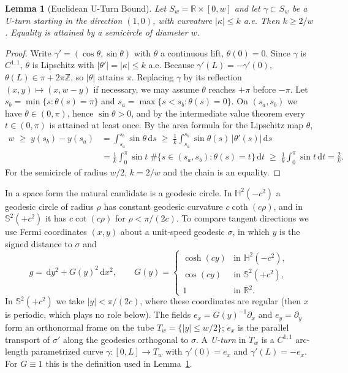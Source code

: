 \documentclass[11pt,reqno]{amsart}
\newtheorem{lemma}[theorem]{Lemma}
\theoremstyle{definition}
\providecommand{\R}{\mathbb{R}}
\providecommand{\Hyp}{\mathbb{H}}
\providecommand{\Sph}{\mathbb{S}}
\providecommand{\dif}{\,\mathrm{d}}
\numberwithin{equation}{section}
\providecommand{\Hyp}{\mathbb{H}}
\providecommand{\Sph}{\mathbb{S}}
\providecommand{\R}{\mathbb{R}}
\begin{document}
\begin{lemma}[Euclidean U-Turn Bound]
\label{lem:euclidean_uturn}
Let $S_w = \R \times [0,w]$ and let $\gamma \subset S_w$ be a U-turn starting in the direction $(1,0)$, with curvature $|\kappa| \le k$ a.e. Then $k \ge 2/w$. Equality is attained by a semicircle of diameter $w$.
\end{lemma}
\begin{proof}
Write $\gamma' = (\cos\theta, \sin\theta)$ with $\theta$ a continuous lift, $\theta(0) = 0$. Since $\gamma$ is $C^{1,1}$, $\theta$ is Lipschitz with $|\theta'| = |\kappa| \le k$ a.e. Because $\gamma'(L) = -\gamma'(0)$, $\theta(L) \in \pi + 2\pi\mathbb{Z}$, so $|\theta|$ attains $\pi$. Replacing $\gamma$ by its reflection $(x,y) \mapsto (x, w - y)$ if necessary, we may assume $\theta$ reaches $+\pi$ before $-\pi$. Let $s_b = \min\{s : \theta(s) = \pi\}$ and $s_a = \max\{s < s_b : \theta(s) = 0\}$. On $(s_a, s_b)$ we have $\theta \in (0, \pi)$, hence $\sin\theta > 0$, and by the intermediate value theorem every $t \in (0,\pi)$ is attained at least once. By the area formula for the Lipschitz map $\theta$,
\[
\begin{aligned}
w \;\ge\; y(s_b) - y(s_a) &= \int_{s_a}^{s_b} \sin\theta \dif s \;\ge\; \frac{1}{k}\int_{s_a}^{s_b} \sin\theta(s)\, |\theta'(s)| \dif s \\
&= \frac{1}{k}\int_0^\pi \sin t \; \#\{s \in (s_a,s_b) : \theta(s) = t\} \dif t \;\ge\; \frac{1}{k}\int_0^\pi \sin t \dif t = \frac{2}{k}.
\end{aligned}
\]
For the semicircle of radius $w/2$, $k = 2/w$ and the chain is an equality.
\end{proof}

In a space form the natural candidate is a geodesic circle. In $\Hyp^2(-c^2)$ a geodesic circle of radius $\rho$ has constant geodesic curvature $c\coth(c\rho)$, and in $\Sph^2(+c^2)$ it has $c\cot(c\rho)$ for $\rho < \pi/(2c)$. To compare tangent directions we use Fermi coordinates $(x, y)$ about a unit-speed geodesic $\sigma$, in which $y$ is the signed distance to $\sigma$ and
\begin{equation}
\label{eq:fermi}
g = \dif y^2 + G(y)^2 \dif x^2, \qquad G(y) = \begin{cases} \cosh(cy) & \text{in } \Hyp^2(-c^2), \\ \cos(cy) & \text{in } \Sph^2(+c^2), \\ 1 & \text{in } \R^2 . \end{cases}
\end{equation}
In $\Sph^2(+c^2)$ we take $|y| < \pi/(2c)$, where these coordinates are regular (then $x$ is periodic, which plays no role below). The fields $e_x = G(y)^{-1}\partial_x$ and $e_y = \partial_y$ form an orthonormal frame on the tube $T_w = \{|y| \le w/2\}$; $e_x$ is the parallel transport of $\sigma'$ along the geodesics orthogonal to $\sigma$. A \emph{U-turn} in $T_w$ is a $C^{1,1}$ arc-length parametrized curve $\gamma\colon [0,L] \to T_w$ with $\gamma'(0) = e_x$ and $\gamma'(L) = -e_x$. For $G \equiv 1$ this is the definition used in Lemma~\ref{lem:euclidean_uturn}.
\end{document}
